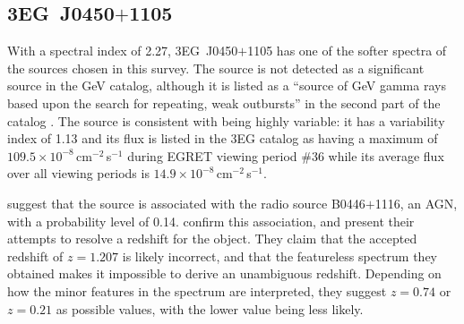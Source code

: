 \subsection{3EG~J0450$+$1105}

With a spectral index of 2.27, 3EG~J0450$+$1105 has one of the softer
spectra of the sources chosen in this survey. The source is not
detected as a significant source in the GeV catalog, although it is
listed as a ``source of GeV gamma rays based upon the search for
repeating, weak outbursts'' in the second part of the catalog
\citep{REF::MACOMB::ICRC1999}. The source is consistent with being 
highly variable: it has a variability index of 1.13 and its flux is
listed in the 3EG catalog as having a maximum of
$109.5\times10^{-8}$\,cm$^{-2}$\,s$^{-1}$ during EGRET viewing period
\#36 while its average flux over all viewing periods is
$14.9\times10^{-8}$\,cm$^{-2}$\,s$^{-1}$.

\citet{REF::MATTOX::APJS2001} suggest that the \Gray source is
associated with the radio source B0446$+$1116, an AGN, with a
probability level of 0.14. \citet{REF::HALPERN::AJ2003} confirm this
association, and present their attempts to resolve a redshift for the
object. They claim that the accepted redshift of $z=1.207$ is likely
incorrect, and that the featureless spectrum they obtained makes it
impossible to derive an unambiguous redshift. Depending on how the
minor features in the spectrum are interpreted, they suggest $z=0.74$
or $z=0.21$ as possible values, with the lower value being less
likely.

